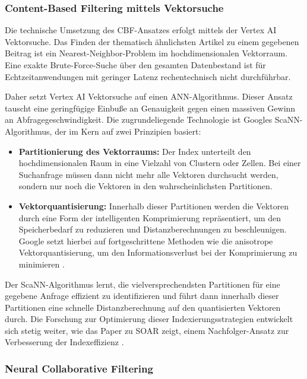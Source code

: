 \subsubsection{Content-Based Filtering mittels Vektorsuche}
\label{sec:cbf_service}

Die technische Umsetzung des \ac{CBF}-Ansatzes erfolgt mittels der Vertex AI Vektorsuche. 
Das Finden der thematisch ähnlichsten Artikel zu einem gegebenen Beitrag ist ein Nearest-Neighbor-Problem
im hochdimensionalen Vektorraum. 
Eine exakte Brute-Force-Suche über den gesamten Datenbestand ist für Echtzeitanwendungen mit geringer Latenz rechentechnisch nicht durchführbar.

Daher setzt Vertex AI Vektorsuche auf einen \ac{ANN}-Algorithmus. 
Dieser Ansatz tauscht eine geringfügige Einbuße an Genauigkeit gegen einen massiven Gewinn an Abfragegeschwindigkeit. 
Die zugrundeliegende Technologie ist Googles \ac{ScaNN}-Algorithmus, der im Kern auf zwei Prinzipien basiert:

\begin{itemize}
    \item \textbf{Partitionierung des Vektorraums:} Der Index unterteilt den hochdimensionalen Raum in eine Vielzahl von Clustern oder Zellen. 
    Bei einer Suchanfrage müssen dann nicht mehr alle Vektoren durchsucht werden, sondern nur noch die Vektoren in den wahrscheinlichsten Partitionen.
    \item \textbf{Vektorquantisierung:} Innerhalb dieser Partitionen werden die Vektoren durch eine Form der intelligenten Komprimierung repräsentiert, 
    um den Speicherbedarf zu reduzieren und Distanzberechnungen zu beschleunigen. Google setzt hierbei auf fortgeschrittene Methoden wie die anisotrope 
    Vektorquantisierung, um den Informationsverlust bei der Komprimierung zu minimieren \cite{avq_2020}.
\end{itemize}

Der ScaNN-Algorithmus lernt, die vielversprechendsten Partitionen für eine gegebene Anfrage effizient zu identifizieren und führt dann innerhalb 
dieser Partitionen eine schnelle Distanzberechnung auf den quantisierten Vektoren durch. 
Die Forschung zur Optimierung dieser Indexierungsstrategien entwickelt sich stetig weiter, wie das Paper zu SOAR zeigt, 
einem Nachfolger-Ansatz zur Verbesserung der Indexeffizienz \cite{soar_2023}.

\subsubsection{Neural Collaborative Filtering}
\label{sec:ncf_service}

